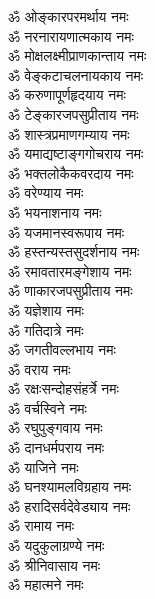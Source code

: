 \begin{multicols}{2}
    \begin{flushleft}
        ॐ ओङ्कारपरमर्थाय नमः\\
        ॐ नरनारायणात्मकाय नमः\\
        ॐ मोक्षलक्ष्मीप्राणकान्ताय नमः\\
        ॐ वेङ्कटाचलनायकाय नमः\\
        ॐ करुणापूर्णहृदयाय नमः\\
        ॐ टेङ्कारजपसुप्रीताय नमः\\
        ॐ शास्त्रप्रमाणगम्याय नमः\\
        ॐ यमाद्यष्टाङ्गगोचराय नमः\\
        ॐ भक्तलोकैकवरदाय नमः\\
        ॐ वरेण्याय नमः\hfill{}\\
                                                        
        ॐ भयनाशनाय नमः\\
        ॐ यजमानस्वरूपाय नमः\\
        ॐ हस्तन्यस्तसुदर्शनाय नमः\\
        ॐ रमावतारमङ्गेशाय नमः\\
        ॐ णाकारजपसुप्रीताय नमः\\
        ॐ यज्ञेशाय नमः\\
        ॐ गतिदात्रे नमः\\
        ॐ जगतीवल्लभाय नमः\\
        ॐ वराय नमः\\
        ॐ रक्षःसन्दोहसंहर्त्रे नमः\hfill{}\\
                                                        
        ॐ वर्चस्विने नमः\\
        ॐ रघुपुङ्गवाय नमः\\
        ॐ दानधर्मपराय नमः\\
        ॐ याजिने नमः\\
        ॐ घनश्यामलविग्रहाय नमः\\
        ॐ हरादिसर्वदेवेड्याय नमः\\
        ॐ रामाय नमः\\
        ॐ यदुकुलाग्रण्ये नमः\\
        ॐ श्रीनिवासाय नमः\\
        ॐ महात्मने नमः\hfill{}\\
                                                        

\end{flushleft}
\end{multicols}
